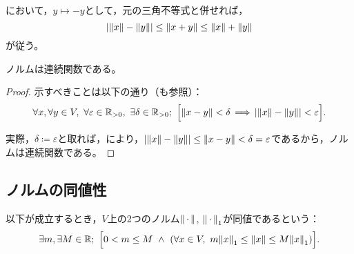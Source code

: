 \documentclass[b5paper,draft]{ltjsbook}
\begin{document}
\begin{cor}[三角不等式]
    において，$y\mapsto -y$として，元の三角不等式と併せれば，
    \begin{equation}
        \abs{\norm{x}-\norm{y}}\leq \norm{x+y}\leq \norm{x}+\norm{y}
    \end{equation}
    が従う。
\end{cor}

\begin{prop}[ノルムの連続性]
    ノルムは連続関数である。
    \begin{proof}
        示すべきことは以下の通り（も参照）：
        \begin{equation}
            \forall x,\forall y\in V,\ \forall \varepsilon\in\Rposi,\
                \exists \delta\in \Rposi;\ \bsqu{
                    \norm{x-y}<\delta\, \Longrightarrow\, \abs{\norm{x}-\norm{y}}<\varepsilon
                }.
        \end{equation}

        実際，$\delta\coloneqq \varepsilon$と取れば，により，$\abs{\norm{x}-\norm{y}}\leq \norm{x-y}<\delta =\varepsilon$であるから，ノルムは連続関数である。
    \end{proof}
\end{prop}

\subsection{ノルムの同値性}

\begin{defi}[ノルムの同値性]
    以下が成立するとき，$V$上の2つのノルム$\norm{\dummy}$, $\norm{\dummy}_1$が同値であるという：
    \begin{equation}
        \exists m, \exists M\in\R;\ \bsqu{0<m\leq M\ \land \ \pare{
            \forall x\in V,\ m\norm{x}_1 \leq \norm{x} \leq M\norm{x}_1
        }}.
    \end{equation}
\end{defi}
\end{document}
